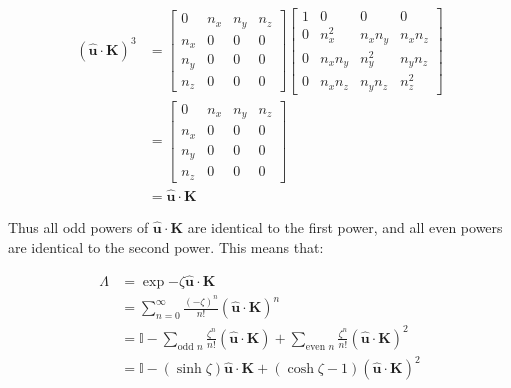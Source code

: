\documentclass[12pt]{article}
\begin{document}
\begin{equation}
    \begin{split}
        (\hat{\mathbf{u}} \cdot \mathbf{K})^{3} &=
        \begin{bmatrix}
            0     & n_{x} & n_{y} & n_{z} \\
            n_{x} & 0     & 0     & 0     \\
            n_{y} & 0     & 0     & 0     \\
            n_{z} & 0     & 0     & 0
        \end{bmatrix}
        \begin{bmatrix}
            1 & 0          & 0          & 0          \\
            0 & n_{x}^{2}  & n_{x}n_{y} & n_{x}n_{z} \\
            0 & n_{x}n_{y} & n_{y}^{2}  & n_{y}n_{z} \\
            0 & n_{x}n_{z} & n_{y}n_{z} & n_{z}^{2}
        \end{bmatrix} \\
        &=
        \begin{bmatrix}
            0     & n_{x} & n_{y} & n_{z} \\
            n_{x} & 0     & 0     & 0     \\
            n_{y} & 0     & 0     & 0     \\
            n_{z} & 0     & 0     & 0
        \end{bmatrix} \\
        &= \hat{\mathbf{u}} \cdot \mathbf{K}
    \end{split}
\end{equation}

Thus all odd powers of $\hat{\mathbf{u}} \cdot \mathbf{K}$ are identical to the first power, and all even powers are identical to the second power. This means that:

\begin{equation}
    \begin{split}
        \Lambda &= \exp{-\zeta \hat{\mathbf{u}} \cdot \mathbf{K}} \\
        &= \sum_{n = 0}^{\infty} \frac{(-\zeta)^{n}}{n!} (\hat{\mathbf{u}} \cdot \mathbf{K})^{n} \\
        &= \mathbb{I} - \sum_{\text{odd } n} \frac{\zeta^{n}}{n!} (\hat{\mathbf{u}} \cdot \mathbf{K}) + \sum_{\text{even } n} \frac{\zeta^{n}}{n!} (\hat{\mathbf{u}} \cdot \mathbf{K})^{2} \\
        &= \mathbb{I} - (\sinh{\zeta}) \hat{\mathbf{u}} \cdot \mathbf{K} + (\cosh{\zeta} - 1) (\hat{\mathbf{u}} \cdot \mathbf{K})^{2}
    \end{split}
\end{equation}
\end{document}
